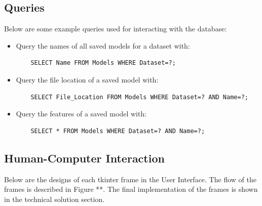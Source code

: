 \documentclass[./project-report/src/latex/project-report.tex]{subfiles}
\begin{document}
\subsection{Queries}

Below are some example queries used for interacting with the database:

\begin{itemize}
    \item Query the names of all saved models for a dataset with:
    \begin{verbatim}
    SELECT Name FROM Models WHERE Dataset=?;
    \end{verbatim}
    \item Query the file location of a saved model with:
    \begin{verbatim}
    SELECT File_Location FROM Models WHERE Dataset=? AND Name=?;
    \end{verbatim}
    \item Query the features of a saved model with:
    \begin{verbatim}
    SELECT * FROM Models WHERE Dataset=? AND Name=?;
    \end{verbatim}
\end{itemize}

\subsection{Human-Computer Interaction}

Below are the designs of each tkinter frame in the User Interface. The flow of the frames is described in Figure **. The final implementation of the frames is shown in the 
technical solution section.
\end{document}
